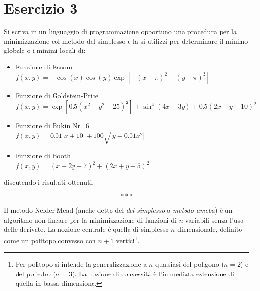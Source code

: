 \section{Esercizio 3}

Si scriva in un linguaggio di programmazione opportuno una procedura per la minimizzazione col metodo del simplesso e la si utilizzi per determinare il minimo globale o i minimi locali di:

\begin{itemize}
	
	\item Funzione di Easom\\
	$f(x,y) = -\cos (x) \cos (y) \exp[-(x-\pi)^2 - (y-\pi)^2]$
	
	\item Funzione di Goldstein-Price\\
	$f(x,y) = \exp[0.5(x^2+y^2-25)^2] + \sin^4(4x-3y) + 0.5(2x+y-10)^2$
	
	\item Funzione di Bukin Nr.~6\\
	$f(x,y) = 0.01\left|x+10\right| + 100\sqrt{\left|y-0.01x^2\right|}$
	
	\item Funzione di Booth\\
	$f(x,y) = (x+2y-7)^2 + (2x+y-5)^2$
	
\end{itemize}
	
\noindent discutendo i risultati ottenuti.

\vfill \[* * * \] \smallskip

\noindent Il metodo Nelder-Mead (anche detto del \emph{del simplesso} o \emph{metodo ameba}) è un algoritmo non lineare per la minimizzazione di funzioni di $n$ variabili senza l'uso delle derivate. La nozione centrale è quella di simplesso $n$-dimensionale, definito come un politopo convesso con $n+1$ vertici\footnote{Per politopo si intende la generalizzazione a $n$ qualsiasi del poligono ($n=2$) e del poliedro ($n=3$). La nozione di convessità è l'immediata estensione di quella in bassa dimensione.}.\vfill

